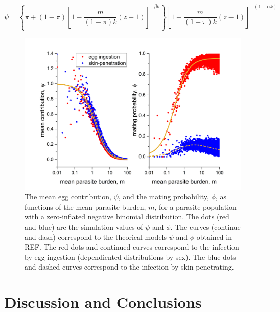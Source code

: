 \documentclass[12pt,a4paper]{article}
\theoremstyle{plain}%
\theoremstyle{definition}
\theoremstyle{remark}
\begin{document}
\begin{equation}%
\psi=	\left\lbrace \pi + (1-\pi) \left[ 1-\frac{m}{(1-\pi) k}(z-1)\right] ^{-\beta k}\right\rbrace \left[ 1-\frac{m}{(1-\pi) k}(z-1)\right] ^{-(1+ \alpha k)}
\end{equation}   

\begin{figure}[h!]
	\centering 	\includegraphics[width=0.9\linewidth]{zinb}
	\caption{The mean egg contribution, $\psi$, and the mating probability, $\phi$, as functions of the mean parasite burden, $m$, for a parasite population with a zero-inflated negative binomial distribution. The dots (red and blue) are the simulation values of $\psi$ and $\phi$.
	The curves (continue and dash) correspond to the theorical models $\psi$ and $\phi$ obtained in REF. The red dots and continued curves correspond to the infection by egg ingestion (dependiented distributions by sex). The blue dots and dashed curves correspond to the infection by skin-penetrating.
	} 
	\label{f:zinb}
\end{figure}

	
	
	
\section{Discussion and Conclusions}
	
\end{document}
